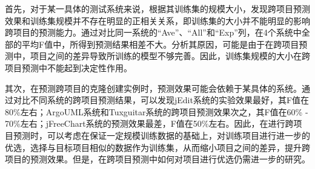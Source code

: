 首先，对于某一具体的测试系统来说，根据其训练集的规模大小，发现跨项目预测效果和训练集规模并不存在明显的正相关关系，即训练集的大小并不能明显的影响跨项目的预测能力。通过对比同一系统的“Ave”、“All”和“Exp”列，在4个系统中全部的平均F值中，所得到预测结果相差不大。分析其原因，可能是由于在跨项目预测中，项目之间的差异导致所训练的模型不够完善。因此，训练集规模的大小在跨项目预测中不能起到决定性作用。

其次，在预测跨项目的克隆创建实例时，预测效果可能会依赖于某具体的系统。通过对比不同系统的跨项目预测结果，可以发现jEdit系统的实验效果最好，其F值在80\%左右；ArgoUML系统和Tuxguitar系统的跨项目预测效果次之，其F值在60\% - 70\%左右；jFreeChart系统的预测效果最差，F值在50\%左右。因此，在进行跨项目预测时，可以考虑在保证一定规模训练数据的基础上，对训练项目进行进一步的优选，选择与目标项目相似的数据作为训练集，从而缩小项目之间的差异，提升跨项目的预测效果。但是，在跨项目预测中如何对项目进行优选仍需进一步的研究。

